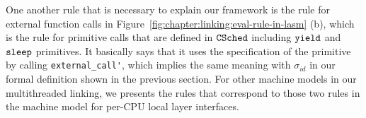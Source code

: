 One another rule that is necessary to explain our framework is the rule for external function calls in Figure~\ref{fig:chapter:linking:eval-rule-in-lasm} (b),
which is the rule for primitive calls that are defined in ${{\mathrm{\texttt{CSched}}}}$ including ${\mathrm{\texttt{yield}}}$ and ${\mathrm{\texttt{sleep}}}$ primitives.
It basically says that it uses 
the specification of the primitive by calling \lstinline$external_call'$,
which implies the same meaning with $\sigma_{id}$ in our formal definition shown in the previous section.
For other machine models in our multithreaded linking,
we presents the rules that correspond to those two rules in the machine model for per-CPU local layer interfaces.


%
%
